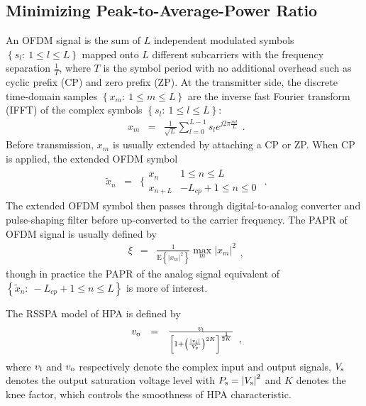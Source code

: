 \documentclass[conference]{IEEEtran}
\begin{document}
\subsection{Minimizing Peak-to-Average-Power Ratio}

An OFDM signal is the sum of $L$ independent modulated symbols
$\left\{s_{l}:\ 1\leq l\leq L\right\}$ mapped onto $L$ different
subcarriers with the frequency separation $\frac{1}{T}$, where $T$
is the symbol period with no additional overhead such as cyclic
prefix (CP) and zero prefix (ZP). At the transmitter side, the
discrete time-domain samples $\left\{x_{m}:\ 1\leq m\leq
L\right\}$ are the inverse fast Fourier transform (IFFT) of the
complex symbols $\left\{s_{l}:\ 1\leq l\leq L\right\}$:
\begin{equation}
\begin{array}{lcl}
x_{m}&=&\frac{1}{\sqrt{L}}\sum\limits_{l=0}^{L-1}s_{l}e^{j2\pi\frac{ml}{L}}
\end{array}.\label{OFDM}
\end{equation}
\noindent Before transmission, $x_{m}$ is usually extended by
attaching a CP or ZP. When CP is applied, the extended OFDM symbol
\begin{equation}
\begin{array}{rcl}
\tilde{x}_{n}&=&\Bigg\{ \begin{array}{ll}x_{n}&1\leq n\leq L\\
x_{n+L}&-L_{cp}+1\leq n\leq 0 \end{array}
\end{array}.
\end{equation}
\noindent The extended OFDM symbol then passes through
digital-to-analog converter and pulse-shaping filter before
up-converted to the carrier frequency. The PAPR of OFDM signal is
usually defined by
\begin{equation}
\begin{array}{rcl}
\xi&=&\frac{1 }{\mbox{E}\left\{\left|x_{m}\right|^2\right\}
}\max\limits_{m} \left|x_{m}\right|^{2}
\end{array},
\end{equation}
\noindent though in practice the PAPR of the analog signal
equivalent of $\left\{\tilde{x}_{n}:\ -L_{cp}+1\leq n\leq
L\right\}$ is more of interest.

The RSSPA model of HPA is defined by
\begin{equation}
\begin{array}{rcl}
v_{\rm o}&=&\frac{v_{\rm i}}{\left[1+\left(\frac{|v_{\rm
i}|}{V_{\rm s}}\right)^{2K}\right]^{\frac{1}{2K}}}
\end{array},\label{RSSPA}
\end{equation}
\noindent where $v_{\rm i}$ and $v_{\rm o}$ respectively denote
the complex input and output signals, $V_{\rm s}$ denotes the
output saturation voltage level with $P_{\rm s}=\left|V_{\rm
s}\right|^2$ and $K$ denotes the knee factor, which controls the
smoothness of HPA characteristic.
\end{document}
